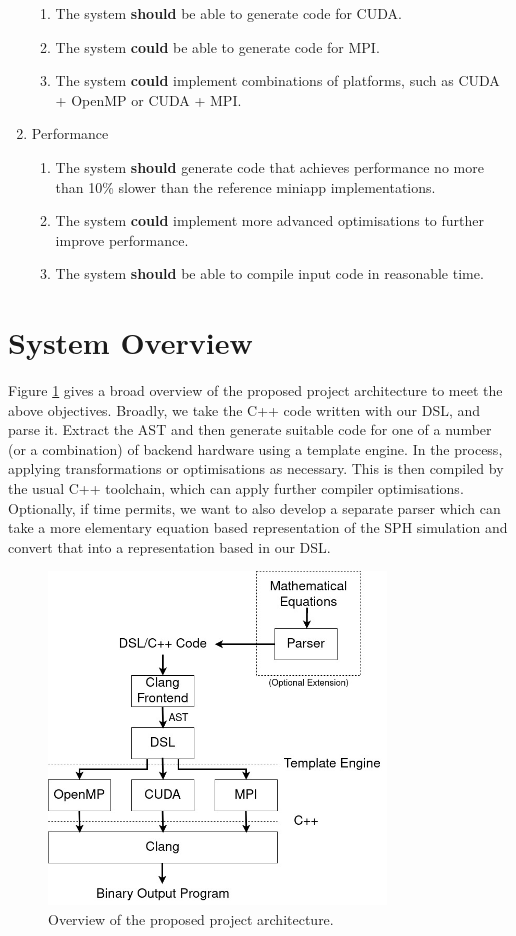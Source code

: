\begin{enumerate}
\begin{enumerate}
        \item The system \textbf{should} be able to generate code for CUDA.
        \item The system \textbf{could} be able to generate code for MPI.
        \item The system \textbf{could} implement combinations of platforms, such as CUDA + OpenMP or CUDA + MPI.
    \end{enumerate}
    \item Performance
    \begin{enumerate}
        \item The system \textbf{should} generate code that achieves performance no more than 10\% slower than the reference miniapp implementations.
        \item The system \textbf{could} implement more advanced optimisations to further improve performance.
        \item The system \textbf{should} be able to compile input code in reasonable time.
    \end{enumerate}
\end{enumerate}

\section{System Overview}

Figure \ref{fig:arch-diagram} gives a broad overview of the proposed project architecture to meet the above objectives. Broadly, we take the C++ code written with our DSL, and parse it. Extract the AST and then generate suitable code for one of a number (or a combination) of backend hardware using a template engine. In the process, applying transformations or optimisations as necessary. This is then compiled by the usual C++ toolchain, which can apply further compiler optimisations. Optionally, if time permits, we want to also develop a separate parser which can take a more elementary equation based representation of the SPH simulation and convert that into a representation based in our DSL.

\begin{figure}[H]
    \centering
    \includegraphics[width=0.8\textwidth]{thesis/diagrams/architecture.jpg}
    \caption{Overview of the proposed project architecture.}
    \label{fig:arch-diagram}
\end{figure}
